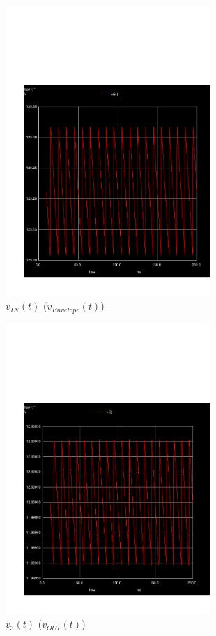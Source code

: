 \begin{figure}[h] \centering
\vspace{-3cm}
\includegraphics[height=11cm]{../sim/trans41.pdf}
\caption{$v_{IN}(t)$ ($v_{Envelope}(t)$)}
\label{fig:SIM_ENV}
\end{figure}

\newpage

\begin{figure}[h] \centering
\vspace{-3cm}
\includegraphics[height=11cm]{../sim/trans42.pdf}
\caption{$v_{3}(t)$ ($v_{OUT}(t)$)}
\label{fig:SIM_OUT}
\end{figure}

